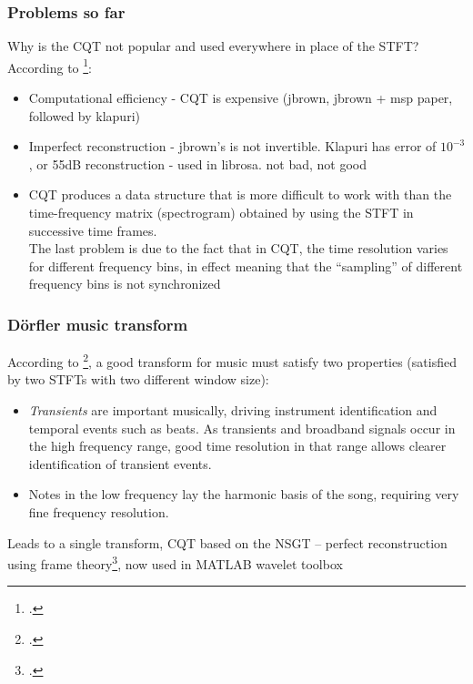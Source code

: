 \documentclass[usenames,dvipsnames]{beamer}
\begin{document}
\begin{frame}
	\frametitle{Problems so far}
	Why is the CQT not popular and used everywhere in place of the STFT? According to \footcite{cqtklapuri}:
	\begin{itemize}
		\item
			Computational efficiency - CQT is expensive (jbrown, jbrown + msp paper, followed by klapuri)
		\item
			Imperfect reconstruction - jbrown's is not invertible. Klapuri has error of $10^{-3}$, or 55dB reconstruction - used in librosa. not bad, not good
		\item
			CQT produces a data structure that is more difficult to work with than the time-frequency matrix (spectrogram) obtained by using the STFT in successive time frames.\\
			The last problem is due to the fact that in CQT, the time resolution varies for different frequency bins, in effect meaning that the ``sampling'' of different frequency bins is not synchronized
	\end{itemize}
\end{frame}

\begin{frame}
	\frametitle{D{\"o}rfler music transform}
	According to \footcite{doerflerphd}, a good transform for music must satisfy two properties (satisfied by two STFTs with two different window size):
\begin{itemize}
	\item
		\textit{Transients} are important musically, driving instrument identification and temporal events such as beats. As transients and broadband signals occur in the high frequency range, good time resolution in that range allows clearer identification of transient events.
	\item
		 Notes in the low frequency lay the harmonic basis of the song, requiring very fine frequency resolution.
\end{itemize}
	Leads to a single transform, CQT based on the NSGT -- perfect reconstruction using frame theory\footcite{balazs, invertiblecqt}, now used in MATLAB wavelet toolbox
\end{frame}
\end{document}
